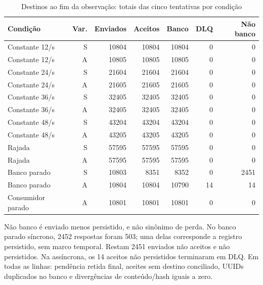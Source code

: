 \begin{table}[htbp]
\centering
\caption{Destinos ao fim da observação: totais das cinco tentativas por condição}
\label{tab:final-destinos}
\small
\setlength{\tabcolsep}{4pt}
\begin{tabular}{lrrrrrr}
\hline
Condição & Var. & Enviados & Aceitos & Banco & DLQ & Não banco \\ \hline
Constante 12/s & S & 10804 & 10804 & 10804 & 0 & 0 \\
Constante 12/s & A & 10805 & 10805 & 10805 & 0 & 0 \\
Constante 24/s & S & 21604 & 21604 & 21604 & 0 & 0 \\
Constante 24/s & A & 21605 & 21605 & 21605 & 0 & 0 \\
Constante 36/s & S & 32405 & 32405 & 32405 & 0 & 0 \\
Constante 36/s & A & 32405 & 32405 & 32405 & 0 & 0 \\
Constante 48/s & S & 43204 & 43204 & 43204 & 0 & 0 \\
Constante 48/s & A & 43205 & 43205 & 43205 & 0 & 0 \\
Rajada & S & 57595 & 57595 & 57595 & 0 & 0 \\
Rajada & A & 57595 & 57595 & 57595 & 0 & 0 \\
Banco parado & S & 10803 & 8351 & 8352 & 0 & 2451 \\
Banco parado & A & 10804 & 10804 & 10790 & 14 & 14 \\
Consumidor parado & A & 10801 & 10801 & 10801 & 0 & 0 \\
\hline
\end{tabular}
\vspace{0.2cm}
\begin{minipage}{\textwidth}
\footnotesize
Não banco é enviado menos persistido, e não sinônimo de perda. No banco parado síncrono, 2452 respostas foram 503; uma delas corresponde a registro persistido, sem marco temporal. Restam 2451 enviados não aceitos e não persistidos. Na assíncrona, os 14 aceitos não persistidos terminaram em DLQ. Em todas as linhas: pendência retida final, aceites sem destino conciliado, UUIDs duplicados no banco e divergências de conteúdo/hash iguais a zero.
\end{minipage}
\end{table}
